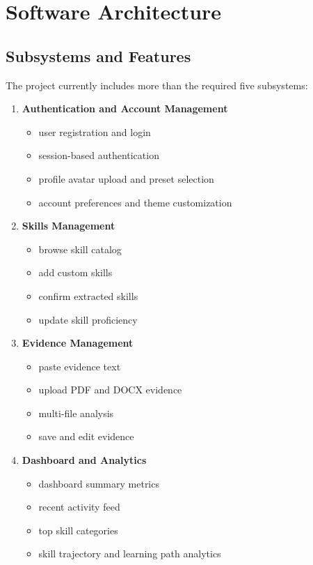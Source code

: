 \documentclass[11pt]{article}
\begin{document}
\section{Software Architecture}

\subsection{Subsystems and Features}
The project currently includes more than the required five subsystems:
\begin{enumerate}[leftmargin=1.5em]
  \item \textbf{Authentication and Account Management}
  \begin{itemize}[leftmargin=1.25em]
    \item user registration and login
    \item session-based authentication
    \item profile avatar upload and preset selection
    \item account preferences and theme customization
  \end{itemize}
  \item \textbf{Skills Management}
  \begin{itemize}[leftmargin=1.25em]
    \item browse skill catalog
    \item add custom skills
    \item confirm extracted skills
    \item update skill proficiency
  \end{itemize}
  \item \textbf{Evidence Management}
  \begin{itemize}[leftmargin=1.25em]
    \item paste evidence text
    \item upload PDF and DOCX evidence
    \item multi-file analysis
    \item save and edit evidence
  \end{itemize}
  \item \textbf{Dashboard and Analytics}
  \begin{itemize}[leftmargin=1.25em]
    \item dashboard summary metrics
    \item recent activity feed
    \item top skill categories
    \item skill trajectory and learning path analytics

\end{itemize}
\end{enumerate}
\end{document}
